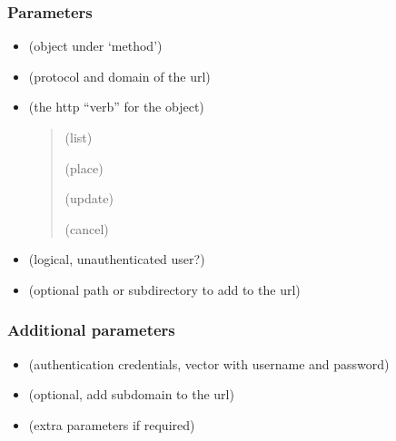 \documentclass[a4paper,12pt,english]{sphinxhowto}
\begin{document}


\subsubsection{Parameters}
\label{\detokenize{Sciencedata_dk:parameters}}\begin{itemize}
\item {} 
 (object under ‘method’)

\item {} 
 (protocol and domain of the url)

\item {} 
 (the http “verb” for the object)
\begin{quote}

 (list)

 (place)

 (update)

 (cancel)
\end{quote}

\item {} 
 (logical, unauthenticated user?)

\item {} 
 (optional path or subdirectory to add to the url)

\end{itemize}



\subsubsection{Additional parameters}
\label{\detokenize{Sciencedata_dk:additional-parameters}}\begin{itemize}
\item {} 
 (authentication credentials, vector with username and password)

\item {} 
 (optional, add subdomain to the url)

\item {} 
 (extra parameters if required)

\end{itemize}
\end{document}
